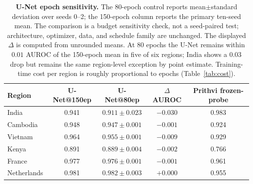 \documentclass{article}
\newcommand{\tablebodygap}{\vspace{0.45em}}
\begin{document}
\begin{table}[H]\centering\small
\caption{\textbf{U-Net epoch sensitivity.}
The 80-epoch control reports mean$\pm$standard deviation over seeds 0--2; the
150-epoch column reports the primary ten-seed mean. The comparison is a budget
sensitivity check, not a seed-paired test; architecture, optimizer, data, and schedule
family are unchanged. The displayed $\Delta$ is computed from unrounded means.
At 80 epochs the U-Net remains within $0.01$ AUROC of the 150-epoch mean in
five of six regions; India shows a $0.03$ drop but remains the same region-level
exception by point estimate. Training-time cost
per region is roughly proportional to epochs (Table~\ref{tab:cost}).}
\label{tab:unet_epoch_sensitivity}
\tablebodygap
\setlength{\tabcolsep}{3pt}
\begin{tabular}{@{}lcccc@{}}
\toprule
Region & U-Net@150ep & U-Net@80ep & $\Delta$ AUROC & Prithvi frozen-probe \\
\midrule
India        & 0.941 & $0.911 \pm 0.023$ & $-0.030$ & 0.983 \\
Cambodia     & 0.948 & $0.947 \pm 0.001$ & $-0.001$ & 0.924 \\
Vietnam      & 0.964 & $0.955 \pm 0.001$ & $-0.009$ & 0.929 \\
Kenya        & 0.891 & $0.889 \pm 0.004$ & $-0.002$ & 0.766 \\
France       & 0.977 & $0.976 \pm 0.001$ & $-0.001$ & 0.961 \\
Netherlands  & 0.981 & $0.982 \pm 0.003$ & $+0.000$ & 0.955 \\
\bottomrule
\end{tabular}
\end{table}
\end{document}

